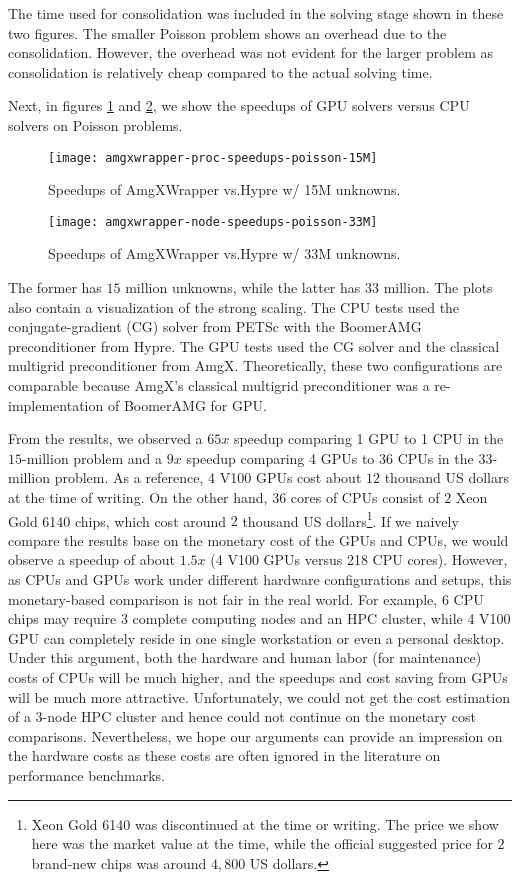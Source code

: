 The time used for consolidation was included in the solving stage shown in these two figures.
The smaller Poisson problem shows an overhead due to the consolidation.
However, the overhead was not evident for the larger problem as consolidation is relatively cheap compared to the actual solving time. 

Next, in figures \ref{fig:amgxwrapper-speedups-15M} and \ref{fig:amgxwrapper-speedups-33M}, we show the speedups of GPU solvers versus CPU solvers on Poisson problems.
\begin{figure}[hbt!]
    \texttt{[image: amgxwrapper-proc-speedups-poisson-15M]}
    \caption{Speedups of AmgXWrapper vs.\@ Hypre w/ 15M unknowns.}
    \label{fig:amgxwrapper-speedups-15M}
\end{figure}
\begin{figure}[hbt!]
    \texttt{[image: amgxwrapper-node-speedups-poisson-33M]}
    \caption{Speedups of AmgXWrapper vs.\@ Hypre w/ 33M unknowns.}
    \label{fig:amgxwrapper-speedups-33M}
\end{figure}
The former has $15$ million unknowns, while the latter has $33$ million.
The plots also contain a visualization of the strong scaling.
The CPU tests used the conjugate-gradient (CG) solver from PETSc with the BoomerAMG preconditioner from Hypre.
The GPU tests used the CG solver and the classical multigrid preconditioner from AmgX.
Theoretically, these two configurations are comparable because AmgX's classical multigrid preconditioner was a re-implementation of BoomerAMG for GPU.

From the results, we observed a $65x$ speedup comparing 1 GPU to 1 CPU in the $15$-million problem and a $9x$ speedup comparing 4 GPUs to 36 CPUs in the $33$-million problem.
As a reference, 4 V100 GPUs cost about $12$ thousand US dollars at the time of writing.
On the other hand, $36$ cores of CPUs consist of $2$ Xeon Gold 6140 chips, which cost around $2$ thousand US dollars\footnote{Xeon Gold 6140 was discontinued at the time or writing. The price we show here was the market value at the time, while the official suggested price for $2$ brand-new chips was around $4,800$ US dollars.}.
If we naively compare the results base on the monetary cost of the GPUs and CPUs, we would observe a speedup of about $1.5x$ (4 V100 GPUs versus 218 CPU cores).
However, as CPUs and GPUs work under different hardware configurations and setups, this monetary-based comparison is not fair in the real world.
For example, $6$ CPU chips may require $3$ complete computing nodes and an HPC cluster, while 4 V100 GPU can completely reside in one single workstation or even a personal desktop.
Under this argument, both the hardware and human labor (for maintenance) costs of CPUs will be much higher, and the speedups and cost saving from GPUs will be much more attractive.
Unfortunately, we could not get the cost estimation of a 3-node HPC cluster and hence could not continue on the monetary cost comparisons.
Nevertheless, we hope our arguments can provide an impression on the hardware costs as these costs are often ignored in the literature on performance benchmarks.

